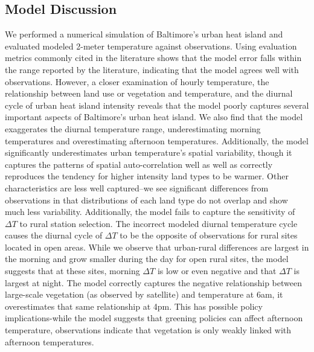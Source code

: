 \subsection{Model Discussion}
We performed a numerical simulation of Baltimore's urban heat island and evaluated modeled 2-meter temperature against observations. 
Using evaluation metrics commonly cited in the literature shows that the model error falls within the range reported by the literature, indicating that the model agrees well with observations. 
However, a closer examination of hourly temperature, the relationship between land use or vegetation and temperature, and the diurnal cycle of urban heat island intensity reveals that the model poorly captures several important aspects of Baltimore's urban heat island. 
We also find %
that the model exaggerates the diurnal temperature range, underestimating morning temperatures and overestimating afternoon temperatures. 
Additionally, the model significantly underestimates urban temperature's spatial variability, though it captures the patterns of spatial auto-correlation well as well as correctly reproduces the tendency for higher intensity land types to be warmer. 
Other characteristics are less well captured--we see significant differences from observations in that distributions of each land type do not overlap and show much less variability. 
Additionally, the model fails to capture the sensitivity of $\Delta T$ to rural station selection. 
The incorrect modeled diurnal temperature cycle causes the diurnal cycle of $\Delta T$ to be the opposite of observations for rural sites located in open areas. 
While we observe that urban-rural differences are largest in the morning and grow smaller during the day for open rural sites, the model suggests that at these sites, morning $\Delta T$ is low or even negative and that $\Delta T$ is largest at night. 
The model %
correctly captures the negative relationship between large-scale vegetation (as observed by satellite) and temperature at 6am, it overestimates that same relationship at 4pm. This has possible policy implications-while the model suggests that greening policies can affect afternoon temperature, observations indicate that vegetation is only weakly linked with afternoon temperatures.
% 

